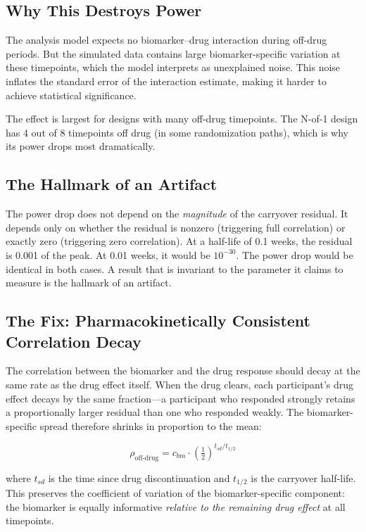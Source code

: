 \documentclass[11pt]{article}
\begin{document}
\subsection{Why This Destroys Power}

The analysis model expects no biomarker--drug interaction
during off-drug periods. But the simulated data contains large
biomarker-specific variation at these timepoints, which the
model interprets as unexplained noise. This noise inflates the
standard error of the interaction estimate, making it harder
to achieve statistical significance.

The effect is largest for designs with many off-drug
timepoints. The N-of-1 design has 4 out of 8 timepoints off
drug (in some randomization paths), which is why its power
drops most dramatically.

\subsection{The Hallmark of an Artifact}

The power drop does not depend on the \emph{magnitude} of the
carryover residual. It depends only on whether the residual is
nonzero (triggering full correlation) or exactly zero
(triggering zero correlation). At a half-life of 0.1 weeks,
the residual is 0.001 of the peak. At 0.01 weeks, it would be
$10^{-30}$. The power drop would be identical in both cases.
A result that is invariant to the parameter it claims to
measure is the hallmark of an artifact.

\subsection{The Fix: Pharmacokinetically Consistent Correlation
            Decay}

The correlation between the biomarker and the drug response
should decay at the same rate as the drug effect itself. When
the drug clears, each participant's drug effect decays by the
same fraction---a participant who responded strongly retains
a proportionally larger residual than one who responded weakly.
The biomarker-specific spread therefore shrinks in proportion
to the mean:

\[
\rho_{\text{off-drug}} = c_{bm} \cdot
  \left(\tfrac{1}{2}\right)^{t_{sd}/t_{1/2}}
\]

where $t_{sd}$ is the time since drug discontinuation and
$t_{1/2}$ is the carryover half-life. This preserves the
coefficient of variation of the biomarker-specific component:
the biomarker is equally informative \emph{relative to the
remaining drug effect} at all timepoints.
\end{document}
